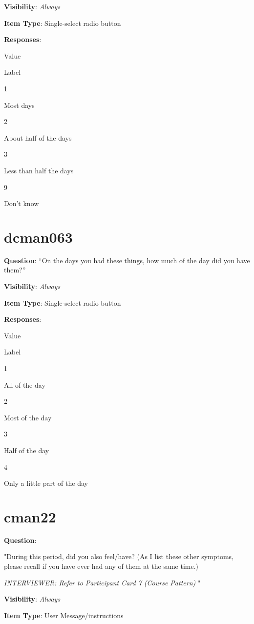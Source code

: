\documentclass[]{book}
\begin{document}
\textbf{Visibility}: \emph{Always}

\textbf{Item Type}: Single-select radio button

\textbf{Responses}:

Value

Label

1

Most days

2

About half of the days

3

Less than half the days

9

Don't know

\hypertarget{dcman063}{%
\section{dcman063}\label{dcman063}}

\textbf{Question}: ``On the days you had these things, how much of the day did you have them?''

\textbf{Visibility}: \emph{Always}

\textbf{Item Type}: Single-select radio button

\textbf{Responses}:

Value

Label

1

All of the day

2

Most of the day

3

Half of the day

4

Only a little part of the day

\hypertarget{cman22}{%
\section{cman22}\label{cman22}}

\textbf{Question}:

"During this period, did you also feel/have? (As I list these other symptoms, please recall if you have ever had any of them at the same time.)

\emph{INTERVIEWER: Refer to Participant Card 7 (Course Pattern) }"

\textbf{Visibility}: \emph{Always}

\textbf{Item Type}: User Message/instructions
\end{document}
